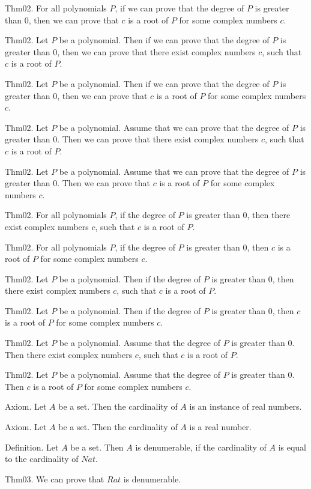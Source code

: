 \documentclass{article}
\begin{document}
Thm02. For all polynomials $P$, if we can prove that the degree of $P$ is greater than $0$, then we can prove that $c$ is a root of $P$ for some complex numbers $c$.

Thm02. Let $P$ be a polynomial. Then if we can prove that the degree of $P$ is greater than $0$, then we can prove that there exist complex numbers $c$, such that $c$ is a root of $P$.

Thm02. Let $P$ be a polynomial. Then if we can prove that the degree of $P$ is greater than $0$, then we can prove that $c$ is a root of $P$ for some complex numbers $c$.

Thm02. Let $P$ be a polynomial. Assume that we can prove that the degree of $P$ is greater than $0$. Then we can prove that there exist complex numbers $c$, such that $c$ is a root of $P$.

Thm02. Let $P$ be a polynomial. Assume that we can prove that the degree of $P$ is greater than $0$. Then we can prove that $c$ is a root of $P$ for some complex numbers $c$.

Thm02. For all polynomials $P$, if the degree of $P$ is greater than $0$, then there exist complex numbers $c$, such that $c$ is a root of $P$.

Thm02. For all polynomials $P$, if the degree of $P$ is greater than $0$, then $c$ is a root of $P$ for some complex numbers $c$.

Thm02. Let $P$ be a polynomial. Then if the degree of $P$ is greater than $0$, then there exist complex numbers $c$, such that $c$ is a root of $P$.

Thm02. Let $P$ be a polynomial. Then if the degree of $P$ is greater than $0$, then $c$ is a root of $P$ for some complex numbers $c$.

Thm02. Let $P$ be a polynomial. Assume that the degree of $P$ is greater than $0$. Then there exist complex numbers $c$, such that $c$ is a root of $P$.

Thm02. Let $P$ be a polynomial. Assume that the degree of $P$ is greater than $0$. Then $c$ is a root of $P$ for some complex numbers $c$.

Axiom. Let $A$ be a set. Then the cardinality of $A$ is an instance of real numbers.

Axiom. Let $A$ be a set. Then the cardinality of $A$ is a real number.

Definition. Let $A$ be a set. Then $A$ is denumerable, if the cardinality of $A$ is equal to the cardinality of $Nat$.

Thm03. We can prove that $Rat$ is denumerable.
\end{document}
